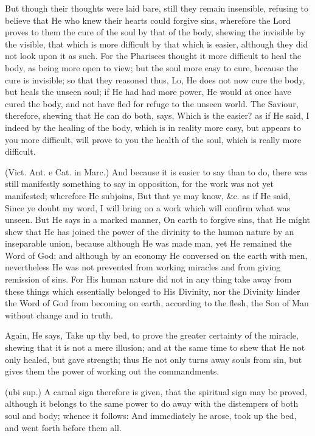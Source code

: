  But though their thoughts were laid bare, still they remain insensible, refusing to believe that He who knew their hearts could forgive sins, wherefore the Lord proves to them the cure of the soul by that of the body, shewing the invisible by the visible, that which is more difficult by that which is easier, although they did not look upon it as such. For the Pharisees thought it more difficult to heal the body, as being more open to view; but the soul more easy to cure, because the cure is invisible; so that they reasoned thus, Lo, He does not now cure the body, but heals the unseen soul; if He had had more power, He would at once have cured the body, and not have fled for refuge to the unseen world. The Saviour, therefore, shewing that He can do both, says, Which is the easier? as if He said, I indeed by the healing of the body, which is in reality more easy, but appears to you more difficult, will prove to you the health of the soul, which is really more difficult.

 (Vict. Ant. e Cat. in Marc.) And because it is easier to say than to do, there was still manifestly something to say in opposition, for the work was not yet manifested; wherefore He subjoins, But that ye may know, \&c. as if He said, Since ye doubt my word, I will bring on a work which will confirm what was unseen. But He says in a marked manner, On earth to forgive sins, that He might shew that He has joined the power of the divinity to the human nature by an inseparable union, because although He was made man, yet He remained the Word of God; and although by an economy He conversed on the earth with men, nevertheless He was not prevented from working miracles and from giving remission of sins. For His human nature did not in any thing take away from these things which essentially belonged to His Divinity, nor the Divinity hinder the Word of God from becoming on earth, according to the flesh, the Son of Man without change and in truth.

 Again, He says, Take up thy bed, to prove the greater certainty of the miracle, shewing that it is not a mere illusion; and at the same time to shew that He not only healed, but gave strength; thus He not only turns away souls from sin, but gives them the power of working out the commandments.

 (ubi sup.) A carnal sign therefore is given, that the spiritual sign may be proved, although it belongs to the same power to do away with the distempers of both soul and body; whence it follows: And immediately he arose, took up the bed, and went forth before them all.

